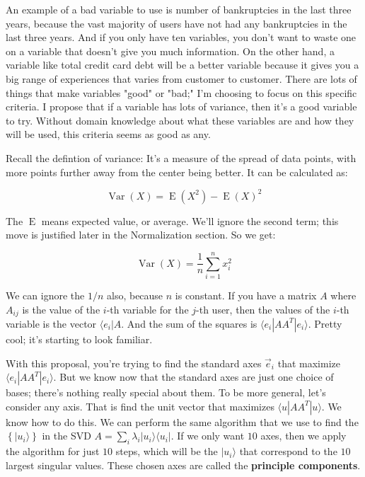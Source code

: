 \documentclass{amsbook}
\begin{document}
An example of a bad variable to use is number of bankruptcies in the last three years, because the vast majority of users have not had any bankruptcies in the last three years.  And if you only have ten variables, you don't want to waste one on a variable that doesn't give you much information.  On the other hand, a variable like total credit card debt will be a better variable because it gives you a big range of experiences that varies from customer to customer.  There are lots of things that make variables "good" or "bad;" I'm choosing to focus on this specific criteria.  I propose that if a variable has lots of variance, then it's a good variable to try.  Without domain knowledge about what these variables are and how they will be used, this criteria seems as good as any.

Recall the defintion of variance:  It's a measure of the spread of data points, with more points further away from the center being better.  It can be calculated as:

\begin{equation}
\label{VarianceEquation}
\operatorname{Var}(X) = \operatorname{E}(X^2) - \operatorname{E}(X)^2
\end{equation}

The $\operatorname{E}$ means expected value, or average.  We'll ignore the second term; this move is justified later in the Normalization section.  So we get:

$$
\operatorname{Var}(X) = \frac{1}{n}\sum_{i=1}^n x_i^2
$$

We can ignore the $1/n$ also, because $n$ is constant.  If you have a matrix $A$ where $A_{ij}$ is the value of the $i$-th variable for the $j$-th user, then the values of the $i$-th variable is the vector $\langle e_i|A$.  And the sum of the squares is $\langle e_i|AA^T|e_i\rangle$.  Pretty cool; it's starting to look familiar.

With this proposal, you're trying to find the standard axes $\vec e_i$ that maximize $\langle e_i|AA^T|e_i\rangle$.  But we know now that the standard axes are just one choice of bases; there's nothing really special about them.  To be more general, let's consider any axis.  That is find the unit vector that maximizes $\langle u|AA^T|u\rangle$.  We know how to do this.  We can perform the same algorithm that we use to find the $\left\{|u_i\rangle\right\}$ in the SVD $A=\sum_i\lambda_i|u_i\rangle\langle u_i|$.  If we only want $10$ axes, then we apply the algorithm for just $10$ steps, which will be the $|u_i\rangle$ that correspond to the $10$ largest singular values.  These chosen axes are called the {\bf principle components}.
\end{document}
